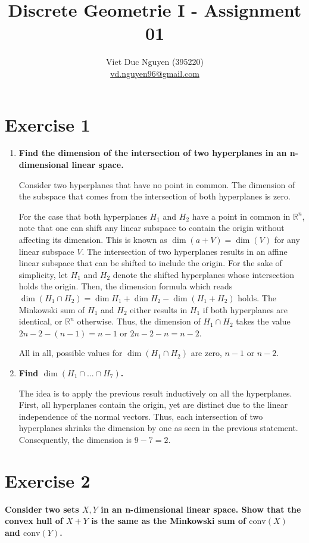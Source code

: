 \documentclass{article}
\title{Discrete Geometrie I - Assignment 01}
\date{}
\author{Viet Duc Nguyen (395220)\\
    \underline{vd.nguyen96@gmail.com}
}
\begin{document}
\maketitle

\section*{Exercise 1}
\begin{enumerate}[label=(\alph*)]
    \item \textbf{Find the dimension of the intersection of two hyperplanes in an n-dimensional linear space.} 

    Consider two hyperplanes that have no point in common. The dimension of the subspace that comes from the intersection of both hyperplanes is zero.

    For the case that both hyperplanes $H_1$ and $H_2$ have a point in common in $\mathbb R^n$, note that one can shift any linear subspace to contain the origin without affecting its dimension. This is known as $\dim(a + V) = \dim(V)$ for any linear subspace $V$. The intersection of two hyperplanes results in an affine linear subspace that can be shifted to include the origin. For the sake of simplicity, let $H_1$ and $H_2$ denote the shifted hyperplanes whose intersection holds the origin. Then, the dimension formula which reads $\dim(H_1 \cap H_2) = \dim H_1 + \dim H_2 - \dim (H_1+H_2)$ holds. The Minkowski sum of $H_1$ and $H_2$ either results in $H_1$ if both hyperplanes are identical, or $\mathbb R^n$ otherwise. Thus, the dimension of $H_1 \cap H_2$ takes the value $2n - 2 - (n - 1) = n-1$ or $2n - 2 - n = n- 2$.

    All in all, possible values for $\dim(H_1 \cap H_2)$ are zero, $n-1$ or $n-2$.


    \item \textbf{Find $\dim(H_1 \cap ... \cap H_7)$.}

    The idea is to apply the previous result inductively on all the hyperplanes. First, all hyperplanes contain the origin, yet are distinct due to the linear independence of the normal vectors. Thus, each intersection of two hyperplanes shrinks the dimension by one as seen in the previous statement. Consequently, the dimension is $9 - 7 = 2$.
\end{enumerate}




\section*{Exercise 2}
\textbf{Consider two sets $X,Y$ in an n-dimensional linear space. Show that the convex hull of $X+Y$ is the same as the Minkowski sum of $\mathrm{conv}(X)$ and $\mathrm{conv}(Y)$.}
\end{document}
